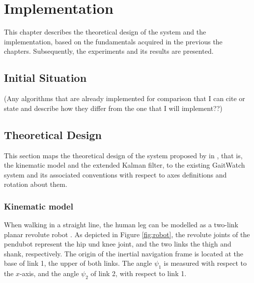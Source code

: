 \chapter{Implementation}
\label{ch:Implementation}

This chapter describes the theoretical design of the system and the implementation, based on the fundamentals acquired in the previous the chapters. Subsequently, the experiments and its results are presented.

\section{Initial Situation}

 (Any algorithms that are already implemented for comparison that I can cite or state and describe how they differ from the one that I will implement??)

\section{Theoretical Design}\label{sec:theoretical_design}

This section maps the theoretical design of the system proposed by \citeauthor{bennett_motion_2014} in \cite{bennett_motion_2014}, that is, the kinematic model and the extended Kalman filter, to the existing GaitWatch system and its associated conventions with respect to axes definitions and rotation about them. 

\subsection{Kinematic model}

When walking in a straight line, the human leg can be modelled as a two-link planar revolute robot \cite{bennett_motion_2014}. As depicted in Figure \ref{fig:robot}, the revolute joints of the \gls{pendubot} represent the hip und knee joint, and the two links the thigh and shank, respectively. The origin of the inertial navigation frame is located at the base of link 1, the upper of both links. The angle $\psi_1$ is measured with respect to the $x$-axis, and the angle $\psi_2$ of link 2, with respect to link 1.

